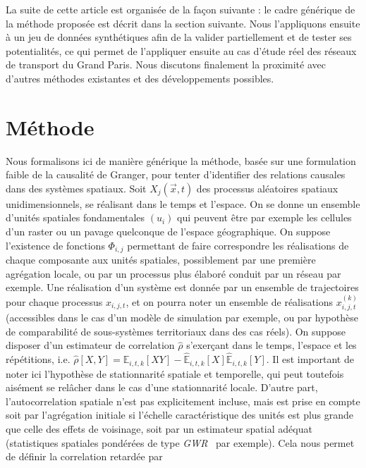 \documentclass[english]{./sageo}
\begin{document}
La suite de cette article est organisée de la façon suivante : le cadre générique de la méthode proposée est décrit dans la section suivante. Nous l'appliquons ensuite à un jeu de données synthétiques afin de la valider partiellement et de tester ses potentialités, ce qui permet de l'appliquer ensuite au cas d'étude réel des réseaux de transport du Grand Paris. Nous discutons finalement la proximité avec d'autres méthodes existantes et des développements possibles.



\section{Méthode}



Nous formalisons ici de manière générique la méthode, basée sur une formulation faible  de la causalité de Granger, pour tenter d'identifier des relations causales dans des systèmes spatiaux. Soit $X_j(\vec{x},t)$ des processus aléatoires spatiaux unidimensionnels, se réalisant dans le temps et l'espace. On se donne un ensemble d'unités spatiales fondamentales $(u_i)$ qui peuvent être par exemple les cellules d'un raster ou un pavage quelconque de l'espace géographique. On suppose l'existence de fonctions $\Phi_{i,j}$ permettant de faire correspondre les réalisations de chaque composante aux unités spatiales, possiblement par une première agrégation locale, ou par un processus plus élaboré conduit par un réseau par exemple. Une réalisation d'un système est donnée par un ensemble de trajectoires pour chaque processus $x_{i,j,t}$, et on pourra noter un ensemble de réalisations $x^{(k)}_{i,j,t}$ (accessibles dans le cas d'un modèle de simulation par exemple, ou par hypothèse de comparabilité de sous-systèmes territoriaux dans des cas réels). On suppose disposer d'un estimateur de correlation $\hat{\rho}$ s'exerçant dans le temps, l'espace et les répétitions, i.e. $\hat{\rho}\left[X,Y\right] = \hat{\mathbb{E}}_{i,t,k}\left[XY\right] - \hat{\mathbb{E}}_{i,t,k}\left[X\right]\hat{\mathbb{E}}_{i,t,k}\left[Y\right]$. Il est important de noter ici l'hypothèse de stationnarité spatiale et temporelle, qui peut toutefois aisément se relâcher dans le cas d'une stationnarité locale. D'autre part, l'autocorrelation spatiale n'est pas explicitement incluse, mais est prise en compte soit par l'agrégation initiale si l'échelle caractéristique des unités est plus grande que celle des effets de voisinage, soit par un estimateur spatial adéquat (statistiques spatiales pondérées de type \emph{GWR}~\cite{brunsdon1998geographically} par exemple). Cela nous permet de définir la correlation retardée par
\end{document}
